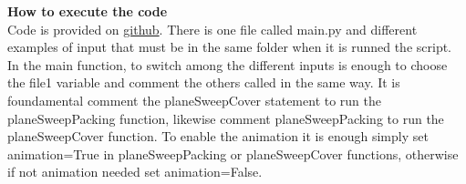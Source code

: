 \documentclass[12pt]{article}
\begin{document}
\noindent \textbf{How to execute the code}\\
Code is provided on \href{https://github.com/okamiRvS/Plane-Sweep-packing-cover}{github}. There is one file called main.py and different examples of input that must be in the same folder when it is runned the script. In the main function, to switch among the different inputs is enough to choose the file1 variable and comment the others called in the same way. It is foundamental comment the planeSweepCover statement to run the planeSweepPacking function, likewise comment planeSweepPacking to run the planeSweepCover function. To enable the animation it is enough simply set animation=True in planeSweepPacking or planeSweepCover functions, otherwise if not animation needed set animation=False.


\end{document}
